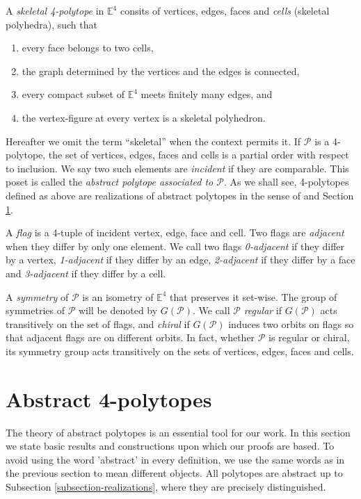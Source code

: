 \documentclass{amsart}
\begin{document}
\noindent
A \textit{skeletal 4-polytope} in $\mathbb{E}^4$ consits of vertices, edges,
faces and \textit{cells} (skeletal polyhedra), such that
    
\begin{enumerate}
\item every face belongs to two cells,
\item the graph determined by the vertices and the edges is connected,
\item every compact subset of $\mathbb{E}^4$ meets finitely many edges, and
\item the vertex-figure at every vertex is a skeletal polyhedron.
\end{enumerate}

\noindent
Hereafter we omit the term ``skeletal'' when the context permits it. If
$\mathcal{P}$ is a 4-polytope, the set of vertices, edges, faces and cells is a
partial order with respect to inclusion. We say two such elements are
\textit{incident} if they are comparable. This poset is called the
\textit{abstract polytope associated to $\mathcal{P}$}. As we shall see,
4-polytopes defined as above are realizations of abstract polytopes in the sense
of \cite{ARP} and Section \ref{section-abstract-4-polytopes}.
	
A \textit{flag} is a 4-tuple of incident vertex, edge, face and cell. Two flags
are \textit{adjacent} when they differ by only one element. We call two flags
\textit{0-adjacent} if they differ by a vertex, \textit{1-adjacent} if they
differ by an edge, \textit{2-adjacent} if they differ by a face and
\textit{3-adjacent} if they differ by a cell.
	
A \textit{symmetry} of $\mathcal{P}$ is an isometry of $\mathbb{E}^4$ that
preserves it set-wise. The group of symmetries of $\mathcal{P}$ will be denoted
by $G(\mathcal{P})$. We call $\mathcal{P}$ \textit{regular} if $G(\mathcal{P})$
acts transitively on the set of flags, and \textit{chiral} if $G(\mathcal{P})$
induces two orbits on flags so that adjacent flags are on different orbits. In
fact, whether $\mathcal{P}$ is regular or chiral, its symmetry group acts
transitively on the sets of vertices, edges, faces and cells.

\section{Abstract 4-polytopes}
\label{section-abstract-4-polytopes}

The theory of abstract polytopes is an essential tool for our work. In this
section we state basic results and constructions upon which our proofs are
based. To avoid using the word 'abstract' in every definition, we use the same
words as in the previous section to mean different objects. All polytopes are
abstract up to Subsection \ref{subsection-realizations}, where they are
precisely distinguished.
	
\end{document}
